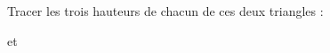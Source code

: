 
\begin{exercice}\label{exosmath-0928}

    Tracer les trois hauteurs de chacun de ces deux triangles :
\begin{center}
   
\end{center}
et
\begin{center}
   
\end{center}


\end{exercice}
